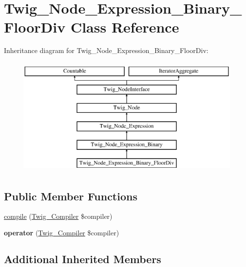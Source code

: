 \hypertarget{class_twig___node___expression___binary___floor_div}{}\section{Twig\+\_\+\+Node\+\_\+\+Expression\+\_\+\+Binary\+\_\+\+Floor\+Div Class Reference}
\label{class_twig___node___expression___binary___floor_div}
Inheritance diagram for Twig\+\_\+\+Node\+\_\+\+Expression\+\_\+\+Binary\+\_\+\+Floor\+Div\+:\begin{figure}[H]
\begin{center}
\leavevmode
\includegraphics[height=6.000000cm]{class_twig___node___expression___binary___floor_div}
\end{center}
\end{figure}
\subsection*{Public Member Functions}
\begin{DoxyCompactItemize}
\item 
\hyperlink{class_twig___node___expression___binary___floor_div_a4e0faa87c3fae583620b84d3607085da}{compile} (\hyperlink{class_twig___compiler}{Twig\+\_\+\+Compiler} \$compiler)
\item 
\hypertarget{class_twig___node___expression___binary___floor_div_af77318ec88d5f8a508684970a150b670}{}{\bfseries operator} (\hyperlink{class_twig___compiler}{Twig\+\_\+\+Compiler} \$compiler)\label{class_twig___node___expression___binary___floor_div_af77318ec88d5f8a508684970a150b670}

\end{DoxyCompactItemize}
\subsection*{Additional Inherited Members}


